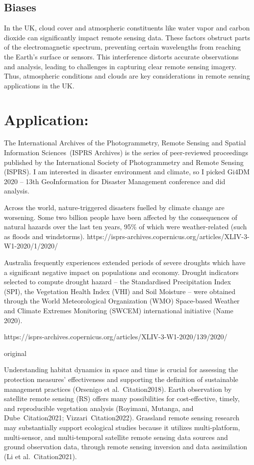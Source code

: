 \documentclass[
  letterpaper,
  DIV=11,
  numbers=noendperiod]{scrreprt}
\begin{document}
\section{Biases}\label{biases}

In the UK, cloud cover and atmospheric constituents like water vapor and
carbon dioxide can significantly impact remote sensing data. These
factors obstruct parts of the electromagnetic spectrum, preventing
certain wavelengths from reaching the Earth's surface or sensors. This
interference distorts accurate observations and analysis, leading to
challenges in capturing clear remote sensing imagery. Thus, atmospheric
conditions and clouds are key considerations in remote sensing
applications in the UK.


\chapter{Application:}\label{application}

The International Archives of the Photogrammetry, Remote Sensing and
Spatial Information Sciences~(ISPRS Archives) is the series of
peer-reviewed proceedings published by the International Society of
Photogrammetry and Remote Sensing (ISPRS). I am interested in disaster
environment and climate, so I picked Gi4DM 2020 -- 13th GeoInformation
for Disaster Management conference and did analysis.

Across the world, nature-triggered disasters fuelled by climate change
are worsening. Some two billion people have been affected by the
consequences of natural hazards over the last ten years, 95\% of which
were weather-related (such as floods and windstorms).
https://isprs-archives.copernicus.org/articles/XLIV-3-W1-2020/1/2020/

Australia frequently experiences extended periods of severe droughts
which have a significant negative impact on populations and economy.
Drought indicators selected to compute drought hazard -- the
Standardised Precipitation Index (SPI), the Vegetation Health Index
(VHI) and Soil Moisture -- were obtained through the World
Meteorological Organization (WMO) Space-based Weather and Climate
Extremes Monitoring (SWCEM) international initiative (Name 2020).

https://isprs-archives.copernicus.org/articles/XLIV-3-W1-2020/139/2020/

original

Understanding habitat dynamics in space and time is crucial for
assessing the protection measures' effectiveness and supporting the
definition of sustainable management practices (Orsenigo et
al.~Citation2018). Earth observation by satellite remote sensing (RS)
offers many possibilities for cost-effective, timely, and reproducible
vegetation analysis (Royimani, Mutanga, and Dube~Citation2021;
Vizzari~Citation2022). Grassland remote sensing research may
substantially support ecological studies because it utilizes
multi-platform, multi-sensor, and multi-temporal satellite remote
sensing data sources and ground observation data, through remote sensing
inversion and data assimilation (Li et al.~Citation2021).
\end{document}
